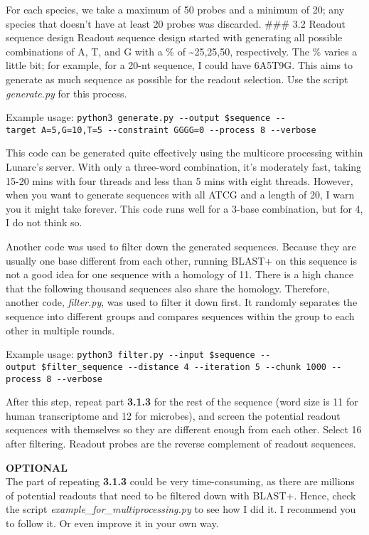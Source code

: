 \documentclass[
]{article}
\begin{document}
For each species, we take a maximum of 50 probes and a minimum of 20;
any species that doesn't have at least 20 probes was discarded. \#\#\#
3.2 Readout sequence design Readout sequence design started with
generating all possible combinations of A, T, and G with a \% of
\textasciitilde25,25,50, respectively. The \% varies a little bit; for
example, for a 20-nt sequence, I could have 6A5T9G. This aims to
generate as much sequence as possible for the readout selection. Use the
script \emph{generate.py} for this process.

Example usage:
\texttt{python3\ generate.py\ -\/-output\ \$sequence\ -\/-target\ A=5,G=10,T=5\ -\/-constraint\ GGGG=0\ -\/-process\ 8\ -\/-verbose}

This code can be generated quite effectively using the multicore
processing within Lunarc's server. With only a three-word combination,
it's moderately fast, taking 15-20 mins with four threads and less than
5 mins with eight threads. However, when you want to generate sequences
with all ATCG and a length of 20, I warn you it might take forever. This
code runs well for a 3-base combination, but for 4, I do not think so.

Another code was used to filter down the generated sequences. Because
they are usually one base different from each other, running BLAST+ on
this sequence is not a good idea for one sequence with a homology of 11.
There is a high chance that the following thousand sequences also share
the homology. Therefore, another code, \emph{filter.py}, was used to
filter it down first. It randomly separates the sequence into different
groups and compares sequences within the group to each other in multiple
rounds.

Example usage:
\texttt{python3\ filter.py\ -\/-input\ \$sequence\ -\/-output\ \$filter\_sequence\ -\/-distance\ 4\ -\/-iteration\ 5\ -\/-chunk\ 1000\ -\/-process\ 8\ -\/-verbose}

After this step, repeat part \textbf{3.1.3} for the rest of the sequence
(word size is 11 for human transcriptome and 12 for microbes), and
screen the potential readout sequences with themselves so they are
different enough from each other. Select 16 after filtering. Readout
probes are the reverse complement of readout sequences.

\textbf{OPTIONAL}\\
The part of repeating \textbf{3.1.3} could be very time-consuming, as
there are millions of potential readouts that need to be filtered down
with BLAST+. Hence, check the script
\emph{example\_for\_multiprocessing.py} to see how I did it. I recommend
you to follow it. Or even improve it in your own way.
\end{document}
